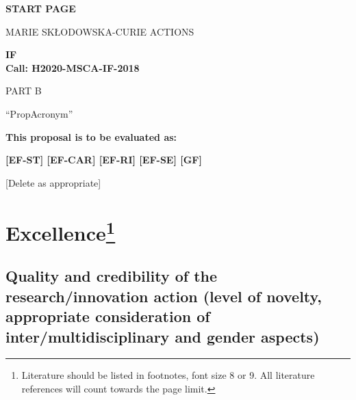 
\phantom{a}
\vspace{15mm}
\begin{center}


        \Large{
      
     
        \textbf{START PAGE}
  
          \vspace{15mm}
          MARIE SK\L{}ODOWSKA-CURIE ACTIONS\\
          \vspace{1cm}
          
          \textbf{\acf{IF}}\\
          \textbf{Call: H2020-MSCA-IF-2018}
          \vspace{2cm}                   

          PART B
          \vspace{2.5cm}

          ``{\sc \ac{PropAcronym}\xspace}''
          \vspace{2cm}

          \textbf{This proposal is to be evaluated as:}
          \vspace{.5cm}

          \textbf{[EF-ST] [EF-CAR] [EF-RI] [EF-SE] [GF]}\\
        }
        \large{[Delete as appropriate]}

  \end{center}
\vspace{1cm}

\newpage
\setcounter{tocdepth}{1}
\tableofcontents



\newpage
\markStartPageLimit
\section[Excellence]{Excellence\footnote{Literature should be listed in footnotes,
    font size 8 or 9.
    All literature references will count towards the page limit.}}
\label{sec:excellence}

\subsection{Quality and credibility of the research/innovation action (level of novelty, appropriate consideration of inter/multidisciplinary and gender aspects)}
\label{sec:excellence_quality}

